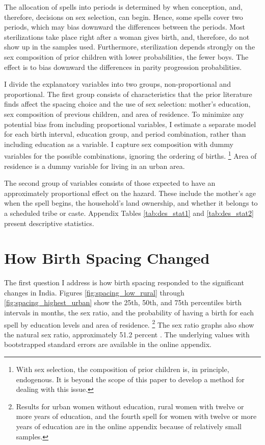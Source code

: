 \documentclass[12pt,letterpaper]{article}
\begin{document}
The allocation of spells into periods is determined by when conception, and, therefore, 
decisions on sex selection, can begin. 
Hence, some spells cover two periods, which may bias downward the differences between the 
periods.
Most sterilizations take place right after a woman gives birth, and,
therefore, do not show up in the samples used. 
Furthermore, sterilization depends strongly on the sex composition of prior children
with lower probabilities, the fewer boys. 
The effect is to bias downward the differences in parity progression probabilities.

I divide the explanatory variables into two groups, non-proportional and proportional. 
The first group consists of characteristics that the prior literature finds affect the 
spacing choice and the use of sex selection: mother’s education, sex composition of 
previous children, and area of residence. 
To minimize any potential bias from including proportional variables, I estimate a 
separate model for each birth interval, education group, and period combination, rather 
than including education as a variable. 
I capture sex composition with dummy variables for the possible combinations, ignoring 
the ordering of births.%
\footnote{
With sex selection, the composition of prior children is, in principle, endogenous. 
It is beyond the scope of this paper to develop a method for dealing with this issue. 
}
Area of residence is a dummy variable for living in an urban area.

The second group of variables consists of those expected to have an approximately 
proportional effect on the hazard.
These include the mother's age when the spell begins, the household's
land ownership, and whether it belongs to a scheduled tribe or caste.
Appendix Tables \ref{tab:des_stat1} and \ref{tab:des_stat2} present descriptive statistics.


\section{How Birth Spacing Changed\label{sec:results}}

The first question I address is how birth spacing responded to the significant 
changes in India.
Figures \ref{fig:spacing_low_rural} through \ref{fig:spacing_highest_urban}
show the 25th, 50th, and 75th percentiles birth intervals in 
months, the sex ratio, and the probability of having a birth for each spell
by education levels and area of residence.%
\footnote{
Results for urban women without education, rural women with twelve or more years of 
education, and the fourth spell for women with twelve or more years of education are
in the online appendix because of relatively small samples.
}
The sex ratio graphs also show the natural sex ratio, approximately 51.2 percent 
\citep{ben-porath76b,jacobsen99,Portner2015b}.
The underlying values with bootstrapped standard errors are available in the online 
appendix.
\end{document}
